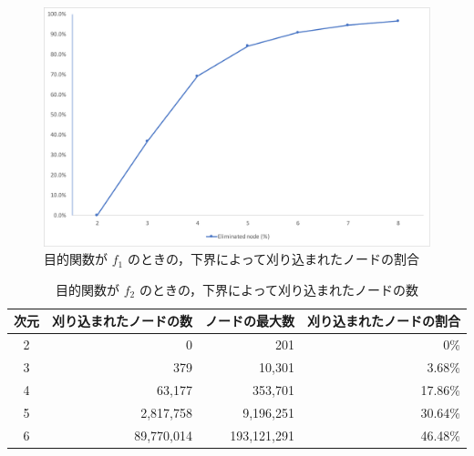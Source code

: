 \documentclass[a4paper,11pt]{jreport}
\begin{document}
\begin{figure}[h]
\begin{center}
\includegraphics[width=14cm]{graphs/f_1_eliminated}
\caption{目的関数が $ f_1 $ のときの，下界によって刈り込まれたノードの割合}
\label{fig:f_1_eliminated}
\end{center}
\end{figure}

\newpage

\begin{table}[h]
\caption{目的関数が $ f_2 $ のときの，下界によって刈り込まれたノードの数}
\label{tbl:f_2_eliminated}
\begin{center}
\begin{tabular}{|c|r|r|r|} \hline
次元 & 刈り込まれたノードの数 & ノードの最大数 & 刈り込まれたノードの割合 \\ \hline
2 & 0 & 201 & 0\% \\
3 & 379 & 10,301 & 3.68\% \\
4 & 63,177 & 353,701 & 17.86\% \\
5 & 2,817,758 & 9,196,251 & 30.64\% \\
6 & 89,770,014 & 193,121,291 & 46.48\% \\ \hline
\end{tabular}
\end{center}
\end{table}
\end{document}
